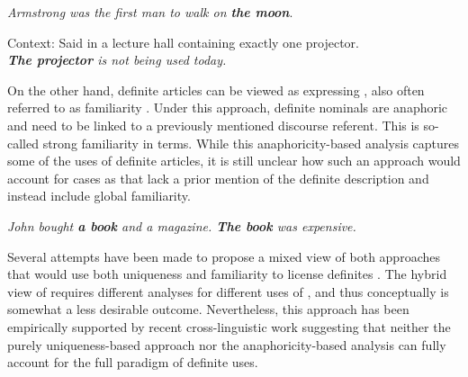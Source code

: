 \documentclass[output=paper,
modfonts
]{langscibook}
\begin{document}
\begin{exe}
\ex \label{ex:sereikaite:13}
\textit{Armstrong was the first man to walk on \textbf{the moon}}.  
\end{exe}

\begin{exe}
\ex \label{ex:sereikaite:14}
Context: Said in a lecture hall containing exactly one projector. \\
\textit{\textbf{The projector} is not being used today.} \citep[537]{Schwarz2013}
\end{exe}

On the other hand, definite articles can be viewed as expressing , also often referred to as familiarity \citep{Christophersen1939,Kamp1981,Heim1982}. Under this approach, definite nominals are anaphoric and need to be linked to a previously mentioned discourse referent. This is so-called strong familiarity in  terms. While this anaphoricity-based analysis captures some of the uses of definite articles, it is still unclear how such an approach would account for cases as  that lack a prior mention of the definite description and instead include global familiarity.  

\begin{exe}
\ex \label{ex:sereikaite:15}
\textit{John bought \textbf{a book} and a magazine. \textbf{The book} was expensive.} \citep[537]{Schwarz2013}
\end{exe}

Several attempts have been made to propose a mixed view of both approaches that would use both uniqueness and familiarity to license definites \citep{Kadmon1990,Farkas2002,Roberts2003}. The hybrid view of  requires different analyses for different uses of , and thus conceptually is somewhat a less desirable outcome. Nevertheless, this approach has been empirically supported by recent cross-linguistic work suggesting that neither the purely uniqueness-based approach nor the anaphoricity-based analysis can fully account for the full paradigm of definite uses.
\end{document}
